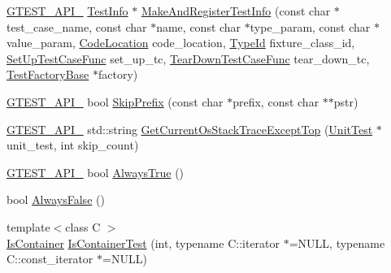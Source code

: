 \begin{DoxyCompactItemize}
\item 
\mbox{\hyperlink{gtest-port_8h_aa73be6f0ba4a7456180a94904ce17790}{G\+T\+E\+S\+T\+\_\+\+A\+P\+I\+\_\+}} \mbox{\hyperlink{classtesting_1_1_test_info}{Test\+Info}} $\ast$ \mbox{\hyperlink{namespacetesting_1_1internal_adbaeb4f56e1d50cdc1d58c0be1d40527}{Make\+And\+Register\+Test\+Info}} (const char $\ast$test\+\_\+case\+\_\+name, const char $\ast$name, const char $\ast$type\+\_\+param, const char $\ast$value\+\_\+param, \mbox{\hyperlink{structtesting_1_1internal_1_1_code_location}{Code\+Location}} code\+\_\+location, \mbox{\hyperlink{namespacetesting_1_1internal_ab1114197d3c657d8b7f8e0c5caa12d00}{Type\+Id}} fixture\+\_\+class\+\_\+id, \mbox{\hyperlink{namespacetesting_1_1internal_a30037044c0b57cdd647c7e2e97cb2cff}{Set\+Up\+Test\+Case\+Func}} set\+\_\+up\+\_\+tc, \mbox{\hyperlink{namespacetesting_1_1internal_a085e31321d0d029c04d2a79234f60c1a}{Tear\+Down\+Test\+Case\+Func}} tear\+\_\+down\+\_\+tc, \mbox{\hyperlink{classtesting_1_1internal_1_1_test_factory_base}{Test\+Factory\+Base}} $\ast$factory)
\item 
\mbox{\hyperlink{gtest-port_8h_aa73be6f0ba4a7456180a94904ce17790}{G\+T\+E\+S\+T\+\_\+\+A\+P\+I\+\_\+}} bool \mbox{\hyperlink{namespacetesting_1_1internal_aac72b20299ad4a99554ce161e1769560}{Skip\+Prefix}} (const char $\ast$prefix, const char $\ast$$\ast$pstr)
\item 
\mbox{\hyperlink{gtest-port_8h_aa73be6f0ba4a7456180a94904ce17790}{G\+T\+E\+S\+T\+\_\+\+A\+P\+I\+\_\+}} std\+::string \mbox{\hyperlink{namespacetesting_1_1internal_ae7ae495d3207e26968dfbd537c5e6dee}{Get\+Current\+Os\+Stack\+Trace\+Except\+Top}} (\mbox{\hyperlink{classtesting_1_1_unit_test}{Unit\+Test}} $\ast$unit\+\_\+test, int skip\+\_\+count)
\item 
\mbox{\hyperlink{gtest-port_8h_aa73be6f0ba4a7456180a94904ce17790}{G\+T\+E\+S\+T\+\_\+\+A\+P\+I\+\_\+}} bool \mbox{\hyperlink{namespacetesting_1_1internal_a4d46f09c3bfe68700b7f728d2cc3782f}{Always\+True}} ()
\item 
bool \mbox{\hyperlink{namespacetesting_1_1internal_a4b24c851ab13569b1b15b3d259b60d2e}{Always\+False}} ()
\item 
{\footnotesize template$<$class C $>$ }\\\mbox{\hyperlink{namespacetesting_1_1internal_ad8f0c2883245f1df2a53618a49f0deb3}{Is\+Container}} \mbox{\hyperlink{namespacetesting_1_1internal_acb6ea1086293c1d6636e3c67941351fb}{Is\+Container\+Test}} (int, typename C\+::iterator $\ast$=N\+U\+LL, typename C\+::const\+\_\+iterator $\ast$=N\+U\+LL)
\item 
$$
\end{DoxyCompactItemize}

